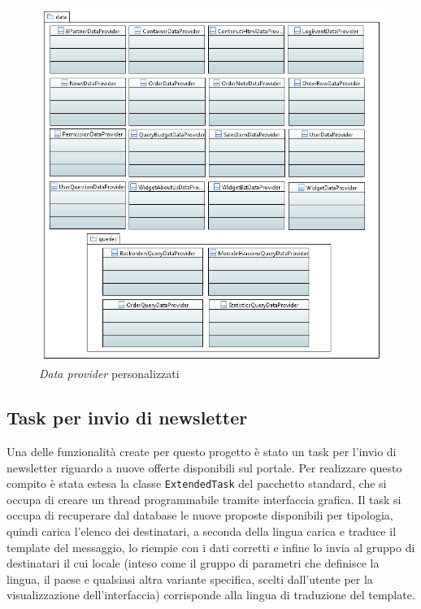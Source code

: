 \begin{figure}
	\centering
	\includegraphics[width=\linewidth]{Immagini/p2/data.png}
	\caption{\textit{Data provider} personalizzati}
	\label{fig:data}
\end{figure}


\subsection{Task per invio di newsletter}
Una delle funzionalità create per questo progetto è stato un task per l'invio di newsletter riguardo a nuove offerte disponibili sul portale. Per realizzare questo compito è stata estesa la classe \texttt{ExtendedTask} del pacchetto standard, che si occupa di creare un thread programmabile tramite interfaccia grafica. Il task si occupa di recuperare dal database le nuove proposte disponibili per tipologia, quindi carica l'elenco dei destinatari, a seconda della lingua carica e traduce il template del messaggio, lo riempie con i dati corretti e infine lo invia al gruppo di destinatari il cui locale (inteso come il gruppo di parametri che definisce la lingua, il paese e qualsiasi altra variante specifica, scelti dall'utente per la visualizzazione dell'interfaccia) corrisponde alla lingua di traduzione del template.

